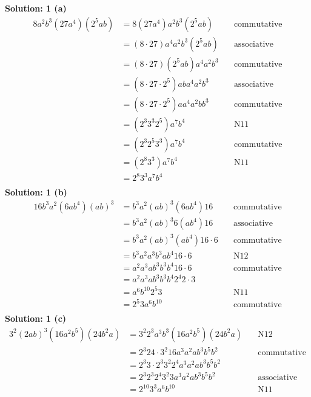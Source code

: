 \textbf{Solution: 1 (a)}
\begin{align*}
8 a^2 b^3 (27 a^4) (2^5 a b) &= 8 (27 a^4) a^2 b^3 (2^5 a b) & \quad \text{commutative} \\
&= (8 \cdot 27 ) a^4 a^2 b^3 (2^5 a b) & \quad \text{associative} \\
&= (8 \cdot 27 ) (2^5 a b) a^4 a^2 b^3 & \quad \text{commutative} \\
&= (8 \cdot 27 \cdot 2^5) a b a^4 a^2 b^3 & \quad \text{associative} \\
&= (8 \cdot 27 \cdot 2^5) a a^4 a^2 b b^3 & \quad \text{commutative} \\
&= (2^3 3^3 2^5) a^7 b^4 & \quad \text{N11} \\
&= (2^3 2^5 3^3) a^7 b^4 & \quad \text{commutative} \\
&= (2^8 3^3) a^7 b^4 & \quad \text{N11} \\
&= 2^8 3^3  a^7 b^4 & \\
\end{align*}
\textbf{Solution: 1 (b)}
\begin{align*}
16 b^3 a^2 (6 a b^4) {(a b)}^3 &= b^3 a^2 {(a b)}^3 (6 a b^4) 16 & \quad \text{commutative} \\
&= b^3 a^2 {(a b)}^3  6 (a b^4) 16 & \quad \text{associative} \\
&= b^3 a^2 {(a b)}^3 (a b^4) 16 \cdot 6 & \quad \text{commutative} \\
&= b^3 a^2 a^3 b^3 a b^4 16 \cdot 6 & \quad \text{N12} \\
&= a^2 a^3 a b^3 b^3 b^4 16 \cdot 6 & \quad \text{commutative} \\
&= a^2 a^3 a b^3 b^3 b^4 2^4 2 \cdot 3 & \quad \text{} \\
&= a^6 b^{10} 2^5 3  & \quad \text{N11} \\
&= 2^5 3 a^6 b^{10} & \quad \text{commutative} \\
\end{align*}
\textbf{Solution: 1 (c)}
\begin{align*}
3^2 {(2 a b)}^3 (16 a^2 b^5) (24 b^2 a) &= 3^2 2^3 a^3 b^3 (16 a^2 b^5) (24 b^2 a) & \quad \text{N12} \\
&= 2^3 24 \cdot 3^2 16 a^3 a^2 a b^3 b^5 b^2 & \quad \text{commutative} \\
&= 2^3 3 \cdot 2^3 3^2 2^4 a^3 a^2 a b^3 b^5 b^2 & \quad \text{} \\
&= 2^3 2^3 2^4 3^2 3 a^3 a^2 a b^3 b^5 b^2 & \quad \text{associative} \\
&= 2^{10} 3^3 a^6 b^{10} & \quad \text{N11} \\
\end{align*}
